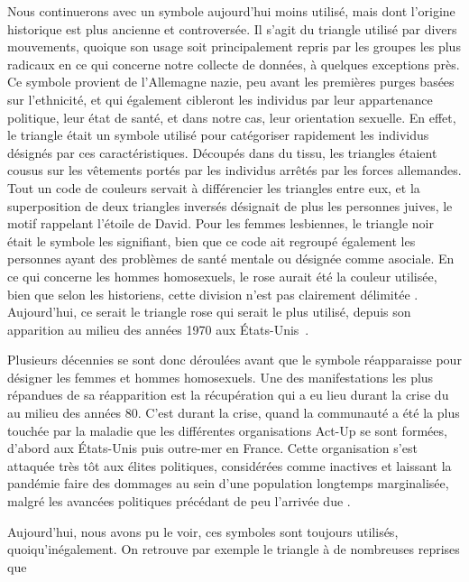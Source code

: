 Nous continuerons avec un symbole aujourd'hui moins utilisé, mais dont l'origine historique est plus ancienne et controversée.
Il s'agit du triangle utilisé par divers mouvements, quoique son usage soit principalement repris par les groupes les plus radicaux en ce qui concerne notre collecte de données, à quelques exceptions près.
Ce symbole provient de l'Allemagne nazie, peu avant les premières purges basées sur l'ethnicité, et qui également cibleront les individus par leur appartenance politique, leur état de santé, et dans notre cas, leur orientation sexuelle.
En effet, le triangle était un symbole utilisé pour catégoriser rapidement les individus désignés par ces caractéristiques.
Découpés dans du tissu, les triangles étaient cousus sur les vêtements portés par les individus arrêtés par les forces allemandes.
Tout un code de couleurs servait à différencier les triangles entre eux, et la superposition de deux triangles inversés désignait de plus les personnes juives, le motif rappelant l'étoile de David.
Pour les femmes lesbiennes, le triangle noir était le symbole les signifiant, bien que ce code ait regroupé également les personnes ayant des problèmes de santé mentale ou désignée comme asociale.
En ce qui concerne les hommes homosexuels, le rose aurait été la couleur utilisée, bien que selon les historiens, cette division n'est pas clairement délimitée \citep[334]{Jensen2002}.
Aujourd'hui, ce serait le triangle rose qui serait le plus utilisé, depuis son apparition au milieu des années 1970 aux États-Unis~\citep[328]{Jensen2002}.

Plusieurs décennies se sont donc déroulées avant que le symbole réapparaisse pour désigner les femmes et hommes homosexuels.
Une des manifestations les plus répandues de sa réapparition est la récupération qui a eu lieu durant la crise du \vih{} au milieu des années 80.
C'est durant la crise, quand la communauté \lgbt{} a été la plus touchée par la maladie que les différentes organisations Act-Up se sont formées, d'abord aux États-Unis puis outre-mer en France.
Cette organisation s'est attaquée très tôt aux élites politiques, considérées comme inactives et laissant la pandémie faire des dommages au sein d'une population longtemps marginalisée, malgré les avancées politiques précédant de peu l'arrivée due \vih{}.

Aujourd'hui, nous avons pu le voir, ces symboles sont toujours utilisés, quoiqu’inégalement.
On retrouve par exemple le triangle à de nombreuses reprises que

